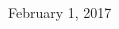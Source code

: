 \begin{titlepage}
\begin{addmargin}[0cm]{0cm}
\begin{center}
{	\vspace{1.0cm}
	\large{February 1, 2017}%
	}
	\end{center}
   \end{addmargin}
\end{titlepage}

